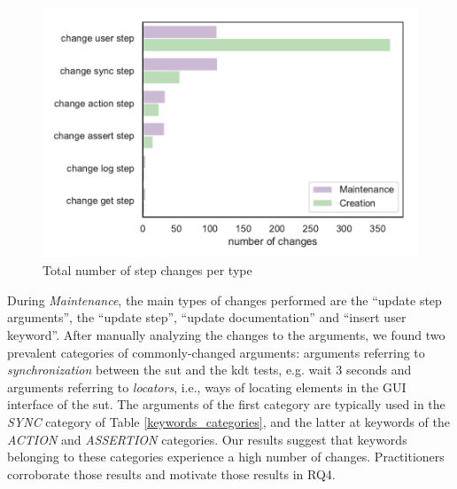 \begin{figure}
\centering
\includegraphics[width=0.7\columnwidth]{figures/evolution/changes_categories.pdf}
\caption{Total number of step changes per type}  
\label{fig:changes_steps}
\end{figure}

During \emph{Maintenance}, the main types of changes performed are the ``update step arguments'', the ``update step'', ``update documentation'' and ``insert user keyword''. After manually analyzing the changes to the arguments, we found two prevalent categories of commonly-changed arguments: arguments referring to \emph{synchronization} between the \gls{sut} and the \gls{kdt} tests, e.g. wait 3 seconds and arguments referring to \emph{locators}, i.e., ways of locating elements in the GUI interface of the \gls{sut}. The arguments of the first category are typically used in the \emph{SYNC} category of Table \ref{keywords_categories}, and the latter at keywords of the \emph{ACTION} and \emph{ASSERTION} categories. Our results suggest that keywords belonging to these categories experience a high number of changes. Practitioners corroborate those results and motivate those results in RQ4.

